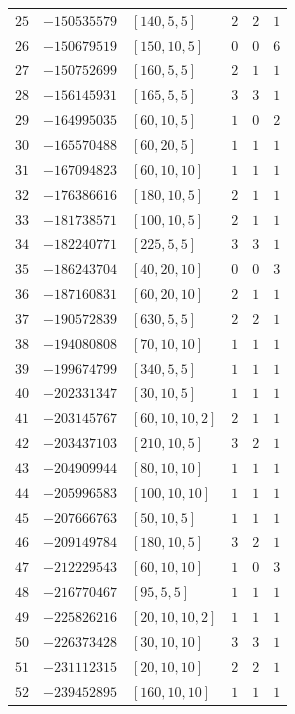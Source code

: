 \documentclass[11pt]{article}
\begin{document}
\begin{center}
\begin{longtable}{r r l c c c}
$25$ & $-150535579$ & $[140,5,5]$ & $2$ & $2$ & $1$\\
$26$ & $-150679519$ & $[150,10,5]$ & $0$ & $0$ & $6$\\
$27$ & $-150752699$ & $[160,5,5]$ & $2$ & $1$ & $1$\\
$28$ & $-156145931$ & $[165,5,5]$ & $3$ & $3$ & $1$\\
$29$ & $-164995035$ & $[60,10,5]$ & $1$ & $0$ & $2$\\
$30$ & $-165570488$ & $[60,20,5]$ & $1$ & $1$ & $1$\\
$31$ & $-167094823$ & $[60,10,10]$ & $1$ & $1$ & $1$\\
$32$ & $-176386616$ & $[180,10,5]$ & $2$ & $1$ & $1$\\
$33$ & $-181738571$ & $[100,10,5]$ & $2$ & $1$ & $1$\\
$34$ & $-182240771$ & $[225,5,5]$ & $3$ & $3$ & $1$\\
$35$ & $-186243704$ & $[40,20,10]$ & $0$ & $0$ & $3$\\
$36$ & $-187160831$ & $[60,20,10]$ & $2$ & $1$ & $1$\\
$37$ & $-190572839$ & $[630,5,5]$ & $2$ & $2$ & $1$\\
$38$ & $-194080808$ & $[70,10,10]$ & $1$ & $1$ & $1$\\
$39$ & $-199674799$ & $[340,5,5]$ & $1$ & $1$ & $1$\\
$40$ & $-202331347$ & $[30,10,5]$ & $1$ & $1$ & $1$\\
$41$ & $-203145767$ & $[60,10,10,2]$ & $2$ & $1$ & $1$\\
$42$ & $-203437103$ & $[210,10,5]$ & $3$ & $2$ & $1$\\
$43$ & $-204909944$ & $[80,10,10]$ & $1$ & $1$ & $1$\\
$44$ & $-205996583$ & $[100,10,10]$ & $1$ & $1$ & $1$\\
$45$ & $-207666763$ & $[50,10,5]$ & $1$ & $1$ & $1$\\
$46$ & $-209149784$ & $[180,10,5]$ & $3$ & $2$ & $1$\\
$47$ & $-212229543$ & $[60,10,10]$ & $1$ & $0$ & $3$\\
$48$ & $-216770467$ & $[95,5,5]$ & $1$ & $1$ & $1$\\
$49$ & $-225826216$ & $[20,10,10,2]$ & $1$ & $1$ & $1$\\
$50$ & $-226373428$ & $[30,10,10]$ & $3$ & $3$ & $1$\\
$51$ & $-231112315$ & $[20,10,10]$ & $2$ & $2$ & $1$\\
$52$ & $-239452895$ & $[160,10,10]$ & $1$ & $1$ & $1$\\

\end{longtable}
\end{center}
\end{document}

